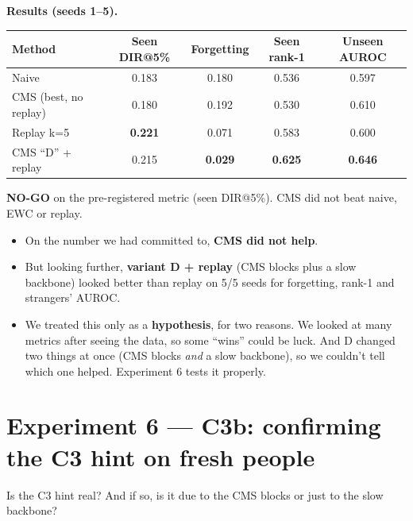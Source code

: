 \documentclass[11pt,a4paper]{article}
\begin{document}
\textbf{Results (seeds 1--5).}
\begin{center}
\begin{tabular}{@{}lcccc@{}}
\toprule
\textbf{Method} & \textbf{Seen DIR@5\%} & \textbf{Forgetting} & \textbf{Seen rank-1} & \textbf{Unseen AUROC}\\
\midrule
Naive & 0.183 & 0.180 & 0.536 & 0.597\\
CMS (best, no replay) & 0.180 & 0.192 & 0.530 & 0.610\\
Replay k=5 & \textbf{0.221} & 0.071 & 0.583 & 0.600\\
CMS ``D'' + replay & 0.215 & \textbf{0.029} & \textbf{0.625} & \textbf{0.646}\\
\bottomrule
\end{tabular}
\end{center}

\begin{verdict}
\textbf{NO-GO} on the pre-registered metric (seen DIR@5\%). CMS did not beat naive, EWC or replay.
\end{verdict}

\begin{means}
\begin{itemize}[leftmargin=1.2em]
  \item On the number we had committed to, \textbf{CMS did not help}.
  \item But looking further, \textbf{variant D + replay} (CMS blocks plus a slow backbone) looked better than replay on 5/5 seeds for forgetting, rank-1 and strangers' AUROC.
  \item We treated this only as a \textbf{hypothesis}, for two reasons. We looked at many metrics after seeing the data, so some ``wins'' could be luck. And D changed two things at once (CMS blocks \emph{and} a slow backbone), so we couldn't tell which one helped. Experiment 6 tests it properly.
\end{itemize}
\end{means}

\section{Experiment 6 --- C3b: confirming the C3 hint on fresh people}

\begin{question}
Is the C3 hint real? And if so, is it due to the CMS blocks or just to the slow backbone?
\end{question}
\end{document}
